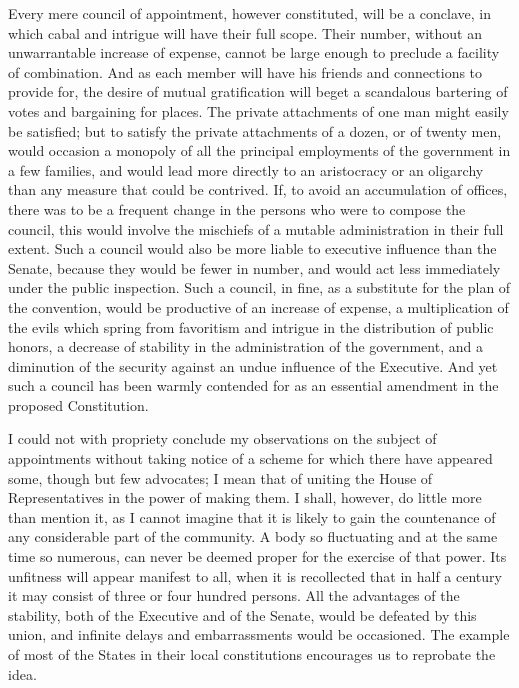Every mere council of appointment, however constituted, will be a conclave, in which cabal and intrigue will have their full scope. 
Their number, without an unwarrantable increase of expense, cannot be large enough to preclude a facility of combination. 
And as each member will have his friends and connections to provide for, the desire of mutual gratification will beget a scandalous bartering of votes and bargaining for places. 
The private attachments of one man might easily be satisfied; but to satisfy the private attachments of a dozen, or of twenty men, would occasion a monopoly of all the principal employments of the government in a few families, and would lead more directly to an aristocracy or an oligarchy than any measure that could be contrived. 
If, to avoid an accumulation of offices, there was to be a frequent change in the persons who were to compose the council, this would involve the mischiefs of a mutable administration in their full extent. 
Such a council would also be more liable to executive influence than the Senate, because they would be fewer in number, and would act less immediately under the public inspection. 
Such a council, in fine, as a substitute for the plan of the convention, would be productive of an increase of expense, a multiplication of the evils which spring from favoritism and intrigue in the distribution of public honors, a decrease of stability in the administration of the government, and a diminution of the security against an undue influence of the Executive. 
And yet such a council has been warmly contended for as an essential amendment in the proposed Constitution.

I could not with propriety conclude my observations on the subject of appointments without taking notice of a scheme for which there have appeared some, though but few advocates; I mean that of uniting the House of Representatives in the power of making them. 
I shall, however, do little more than mention it, as I cannot imagine that it is likely to gain the countenance of any considerable part of the community. 
A body so fluctuating and at the same time so numerous, can never be deemed proper for the exercise of that power. 
Its unfitness will appear manifest to all, when it is recollected that in half a century it may consist of three or four hundred persons. 
All the advantages of the stability, both of the Executive and of the Senate, would be defeated by this union, and infinite delays and embarrassments would be occasioned. 
The example of most of the States in their local constitutions encourages us to reprobate the idea.

